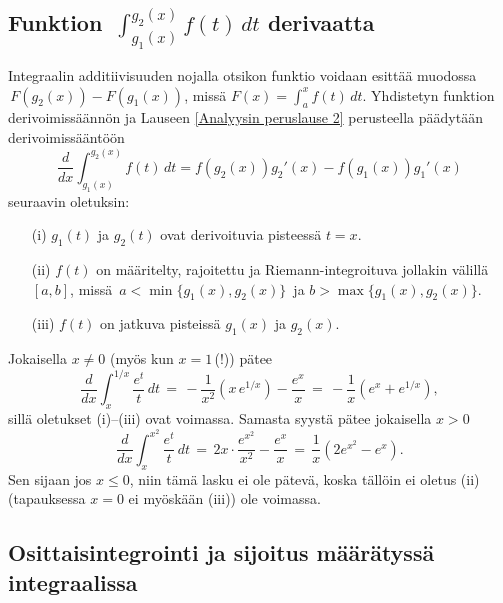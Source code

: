\subsection{Funktion $\,\int_{g_1(x)}^{g_2(x)} f(t)\,dt$ derivaatta}

Integraalin additiivisuuden nojalla otsikon funktio voidaan esittää muodossa \linebreak
$\,F(g_2(x))-F(g_1(x))$, missä $F(x)=\int_a^x f(t)\,dt$. Yhdistetyn funktion derivoimissäännön
ja Lauseen \ref{Analyysin peruslause 2} perusteella päädytään derivoimissääntöön
\[
\boxed{\quad \frac{d}{dx}\int_{g_1(x)}^{g_2(x)} f(t)\, dt 
                      = f(g_2(x))g_2'(x)-f(g_1(x))g_1'(x) \quad}
\]
seuraavin oletuksin:
\begin{itemize}
\item[(i)]   $g_1(t)$ ja $g_2(t)$ ovat derivoituvia pisteessä $t=x$.
\item[(ii)]  $f(t)$ on määritelty, rajoitettu ja Riemann-integroituva jollakin välillä $[a,b]$,
             missä $\,a<\min\{g_1(x),g_2(x)\}\,$ ja $b>\max\{g_1(x),g_2(x)\}$.
\item[(iii)] $f(t)$ on jatkuva pisteissä $g_1(x)$ ja $g_2(x)$.
\end{itemize}
\begin{Exa} Jokaisella $x \neq 0$ (myös kun $x=1$\,(!)) pätee
\[
\frac{d}{dx}\int_x^{1/x} \frac{e^t}{t}\,dt\,
               =\,-\frac{1}{x^2}\left(x\,e^{1/x}\right)-\frac{e^x}{x}\,
               =\,-\frac{1}{x}(e^x+e^{1/x}),
\]
sillä oletukset (i)--(iii) ovat voimassa. Samasta syystä pätee jokaisella $x>0$
\[
\frac{d}{dx}\int_x^{x^2} \frac{e^t}{t}\,dt\,
               =\,2x \cdot \frac{e^{x^2}}{x^2}-\frac{e^x}{x}\,
               =\,\frac{1}{x}(2e^{x^2}-e^x).
\]
Sen sijaan jos $x \le 0$, niin tämä lasku ei ole pätevä, koska tällöin ei oletus (ii) 
(tapauksessa $x=0$ ei myöskään (iii)) ole voimassa. \loppu
\end{Exa}

\subsection{Osittaisintegrointi ja sijoitus määrätyssä integraalissa}

